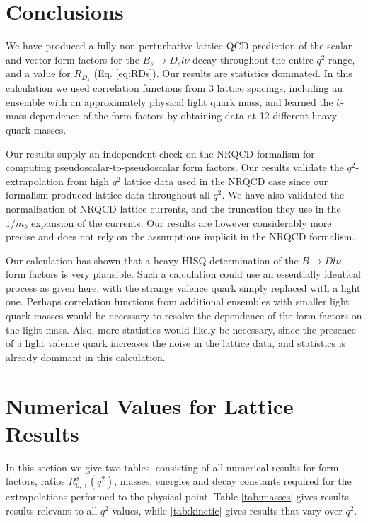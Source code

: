 \section{Conclusions}
\label{sec:BsDs_conclusions}

We have produced a fully non-perturbative lattice QCD prediction of the scalar and vector form factors for the $B_s\to D_s l\nu$ decay throughout the entire $q^2$ range, and a value for $R_{D_s}$ (Eq. \eqref{eq:RDs}). Our results are statistics dominated. In this calculation we used correlation functions from 3 lattice spacings, including an ensemble with an approximately physical light quark mass, and learned the $b$-mass dependence of the form factors by obtaining data at 12 different heavy quark masses.

Our results supply an independent check on the NRQCD formalism for computing pseudoscalar-to-pseudoscalar form factors. Our results validate the $q^2$-extrapolation from high $q^2$ lattice data used in the NRQCD case since our formalism produced lattice data throughout all $q^2$. We have also validated the normalization of NRQCD lattice currents, and the truncation they use in the $1/m_b$ expansion of the currents. Our results are however considerably more precise and does not rely on the assumptions implicit in the NRQCD formalism.

Our calculation has shown that a heavy-HISQ determination of the $B\to Dl\nu$ form factors is very plausible. Such a calculation could use an essentially identical process as given here, with the strange valence quark simply replaced with a light one. Perhaps correlation functions from additional ensembles with smaller light quark masses would be necessary to resolve the dependence of the form factors on the light mass. Also, more statistics would likely be necessary, since the presence of a light valence quark increases the noise in the lattice data, and statistics is already dominant in this calculation.

\section{Numerical Values for Lattice Results}
\label{sec:tables}

In this section we give two tables, consisting of all numerical results for form factors, ratios $R_{0,+}^s(q^2)$, masses, energies and decay constants required for the extrapolations performed to the physical point. Table \ref{tab:masses} gives results results relevant to all $q^2$ values, while \ref{tab:kinetic} gives results that vary over $q^2$.

